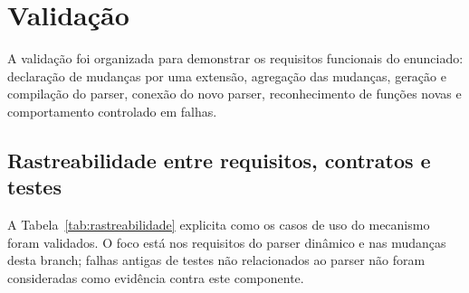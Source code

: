 \documentclass[12pt,a4paper]{article}
\begin{document}
\section{Valida\c{c}\~ao}

A valida\c{c}\~ao foi organizada para demonstrar os requisitos funcionais do enunciado: declara\c{c}\~ao de mudan\c{c}as por uma extens\~ao, agrega\c{c}\~ao das mudan\c{c}as, gera\c{c}\~ao e compila\c{c}\~ao do parser, conex\~ao do novo parser, reconhecimento de fun\c{c}\~oes novas e comportamento controlado em falhas.

\subsection{Rastreabilidade entre requisitos, contratos e testes}

A Tabela~\ref{tab:rastreabilidade} explicita como os casos de uso do mecanismo foram validados. O foco est\'a nos requisitos do parser din\^amico e nas mudan\c{c}as desta branch; falhas antigas de testes n\~ao relacionados ao parser n\~ao foram consideradas como evid\^encia contra este componente.
\end{document}
